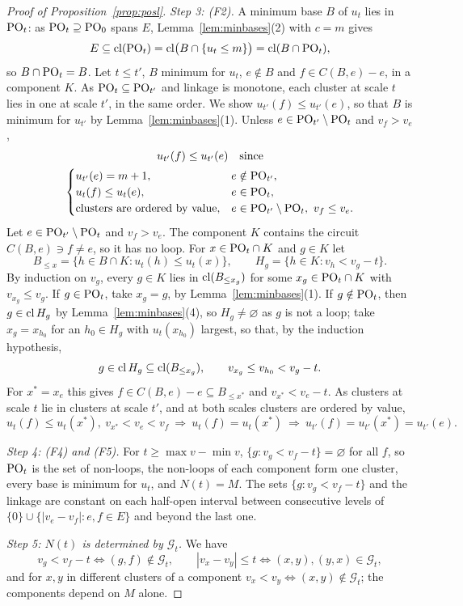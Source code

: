 \begin{proof}[Proof of Proposition~\ref{prop:posl}]
\emph{Step 3: (F2).}  A minimum base $B$ of $u_t$ lies in $\mathrm{PO}_t$: as
$\mathrm{PO}_t\supseteq\mathrm{PO}_0$ spans $E$, Lemma~\ref{lem:minbases}(2) with $c=m$ gives
\[
  E\subseteq\operatorname{cl}(\mathrm{PO}_t)=\operatorname{cl}\bigl(B\cap\{u_t\le m\}\bigr)=\operatorname{cl}(B\cap\mathrm{PO}_t),
\]
so $B\cap\mathrm{PO}_t=B$.  Let $t\le t'$, $B$ minimum for $u_t$, $e\notin B$ and
$f\in C(B,e)-e$, in a component $K$.  As $\mathrm{PO}_t\subseteq\mathrm{PO}_{t'}$ and linkage is
monotone, each cluster at scale $t$ lies in one at scale $t'$, in the same order.
We show $u_{t'}(f)\le u_{t'}(e)$, so that $B$ is minimum for $u_{t'}$ by
Lemma~\ref{lem:minbases}(1).  Unless $e\in\mathrm{PO}_{t'}\setminus\mathrm{PO}_t$ and $v_f>v_e$,
\[
  \begin{gathered}
  u_{t'}(f)\le u_{t'}(e)\quad\text{since}\\
  \begin{cases}
    u_{t'}(e)=m+1,&e\notin\mathrm{PO}_{t'},\\
    u_t(f)\le u_t(e),&e\in\mathrm{PO}_t,\\
    \text{clusters are ordered by value},&e\in\mathrm{PO}_{t'}\setminus\mathrm{PO}_t,\ v_f\le v_e.
  \end{cases}
  \end{gathered}
\]
Let $e\in\mathrm{PO}_{t'}\setminus\mathrm{PO}_t$ and $v_f>v_e$.  The component $K$ contains the
circuit $C(B,e)\ni f\ne e$, so it has no loop.  For $x\in\mathrm{PO}_t\cap K$ and $g\in K$
let
\[
  B_{\le x}=\{h\in B\cap K:u_t(h)\le u_t(x)\},\qquad H_g=\{h\in K:v_h<v_g-t\}.
\]
By induction on $v_g$, every $g\in K$ lies in $\operatorname{cl}(B_{\le x_g})$ for some
$x_g\in\mathrm{PO}_t\cap K$ with $v_{x_g}\le v_g$.  If $g\in\mathrm{PO}_t$, take $x_g=g$, by
Lemma~\ref{lem:minbases}(1).  If $g\notin\mathrm{PO}_t$, then $g\in\operatorname{cl} H_g$ by
Lemma~\ref{lem:minbases}(4), so $H_g\ne\varnothing$ as $g$ is not a loop; take
$x_g=x_{h_0}$ for an $h_0\in H_g$ with $u_t(x_{h_0})$ largest, so that, by the
induction hypothesis,
\[
  g\in\operatorname{cl} H_g\subseteq\operatorname{cl}(B_{\le x_g}),\qquad v_{x_g}\le v_{h_0}<v_g-t.
\]
For $x^{*}=x_e$ this gives $f\in C(B,e)-e\subseteq B_{\le x^{*}}$ and
$v_{x^{*}}<v_e-t$.  As clusters at scale $t$ lie in clusters at scale $t'$, and at
both scales clusters are ordered by value,
\[
  u_t(f)\le u_t(x^{*}),\ v_{x^{*}}<v_e<v_f\ \Rightarrow\ u_t(f)=u_t(x^{*})\
  \Rightarrow\ u_{t'}(f)=u_{t'}(x^{*})=u_{t'}(e).
\]

\emph{Step 4: (F4) and (F5).}  For $t\ge\max v-\min v$, $\{g:v_g<v_f-t\}=\varnothing$
for all $f$, so $\mathrm{PO}_t$ is the set of non-loops, the non-loops of each component
form one cluster, every base is minimum for $u_t$, and $N(t)=M$.  The sets
$\{g:v_g<v_f-t\}$ and the linkage are constant on each half-open interval between
consecutive levels of $\{0\}\cup\{|v_e-v_f|:e,f\in E\}$ and beyond the last one.

\emph{Step 5: $N(t)$ is determined by $\mathcal G_t$.}  We have
\[
  v_g<v_f-t\iff(g,f)\notin\mathcal G_t,\qquad |v_x-v_y|\le t\iff(x,y),(y,x)\in\mathcal G_t,
\]
and for $x,y$ in different clusters of a component $v_x<v_y\iff(x,y)\notin\mathcal G_t$;
the components depend on $M$ alone.
\end{proof}

